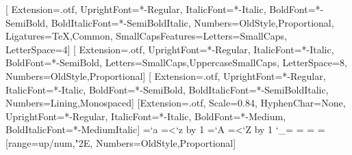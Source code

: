 \setmainfont{EBGaramond}[
  Extension=.otf,
  UprightFont=*-Regular, ItalicFont=*-Italic,
  BoldFont=*-SemiBold, BoldItalicFont=*-SemiBoldItalic,
  Numbers={OldStyle,Proportional},
  Ligatures={TeX,Common},
  SmallCapsFeatures={Letters=SmallCaps, LetterSpace=4}]
\newfontfamily{}[
  Extension=.otf, UprightFont=*-Regular, ItalicFont=*-Italic,
  BoldFont=*-SemiBold,
  Letters={SmallCaps,UppercaseSmallCaps}, LetterSpace=8,
  Numbers={OldStyle,Proportional}]
\newfontfamily{}[
  Extension=.otf, UprightFont=*-Regular, ItalicFont=*-Italic,
  BoldFont=*-SemiBold, BoldItalicFont=*-SemiBoldItalic,
  Numbers={Lining,Monospaced}]
\setmonofont{IBMPlexMono}[Extension=.otf, Scale=0.84, HyphenChar=None,
  UprightFont=*-Regular, ItalicFont=*-Italic,
  BoldFont=*-Medium, BoldItalicFont=*-MediumItalic]
\newXeTeXintercharclass\nfLower
\newXeTeXintercharclass\nfUpper
\newXeTeXintercharclass\nfUnder
{}=`a \loop\XeTeXcharclass{}=\nfLower\ifnum{}<`z\advance{} by 1\repeat
{}=`A \loop\XeTeXcharclass{}=\nfUpper\ifnum{}<`Z\advance{} by 1\repeat
\XeTeXcharclass`_=\nfUnder
\XeTeXinterchartoks\nfLower\nfUpper={\hskip0pt\relax}
\XeTeXinterchartoks\nfUnder\nfUpper={\hskip0pt\relax}
\XeTeXinterchartoks\nfUnder\nfLower={\hskip0pt\relax}
\let\nforigtexttt\texttt
\renewcommand{\texttt}[1]{\nforigtexttt{\XeTeXinterchartokenstate=1 #1}}
[range={up/num,"2E}, Numbers={OldStyle,Proportional}]
\makeatletter
{\nftabfont\xdef\nf@tabfamily{\f@family}}
\DeclareSymbolFont{nflin}{TU}{\nf@tabfamily}{m}{n}
\def\nf@set#1{\Umathcode`#1=0 \symnflin `#1\relax}
\newcommand\nflinmath{\@tfor\nf@d:=0123456789.\do{\expandafter\nf@set\nf@d}}
\makeatother
\newcommand{\nfcaps}[1]{{\nfcapsfont #1}}

